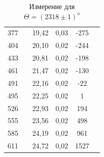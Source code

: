 \documentclass[a4paper,12pt]{report}
\begin{document}
\begin{table}[H]
\begin{tabular}{|c|c|c|c|c|c|}
377 &                     & 19,42 & 0,03 & -275 &                     \\ \cline{1-1} \cline{3-5}
404 &                     & 20,10 & 0,02 & -244 &                     \\ \cline{1-1} \cline{3-5}
433 &                     & 20,81 & 0,02 & -198 &                     \\ \cline{1-1} \cline{3-5}
461 &                     & 21,47 & 0,02 & -130 &                     \\ \cline{1-1} \cline{3-5}
491 &                     & 22,16 & 0,02 & -22  &                     \\ \cline{1-1} \cline{3-5}
495 &                     & 22,25 & 0,02 & 1    &                     \\ \cline{1-1} \cline{3-5}
526 &                     & 22,93 & 0,02 & 194  &                     \\ \cline{1-1} \cline{3-5}
555 &                     & 23,56 & 0,02 & 498  &                     \\ \cline{1-1} \cline{3-5}
585 &                     & 24,19 & 0,02 & 961  &                     \\ \cline{1-1} \cline{3-5}
611 &                     & 24,72 & 0,02 & 1527 &                     \\ \hline
\end{tabular}
\caption{Измерение для $\Theta = (2318\pm 1) ^{o}$}
\end{table}
\end{document}

